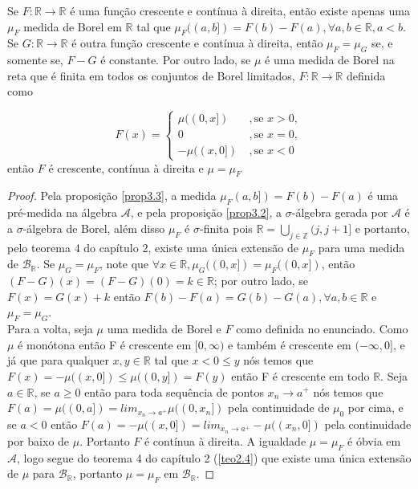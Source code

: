 \begin{teorema}
    Se $F: \mathbb{R} \longrightarrow \mathbb{R}$ é uma função crescente e contínua à direita, então existe apenas uma $\mu_F$ medida de Borel em $\mathbb{R}$ tal que $\mu_F((a,b])=F(b)-F(a), \forall a,b \in \mathbb{R}, a<b$. Se $G: \mathbb{R} \longrightarrow \mathbb{R}$ é outra função crescente e contínua à direita, então $\mu_F = \mu_G$ se, e somente se, $F-G$ é constante. Por outro lado, se $\mu$ é uma medida de Borel na reta que é finita em todos os conjuntos de Borel limitados, $F: \mathbb{R} \longrightarrow \mathbb{R}$ definida como 

    \[
    F(x) = 
    \begin{cases}
         \mu((0,x])  \ & , \text{se } x>0, \\
         0  \ & , \text{se } x=0, \\
         -\mu((x,0])  \ &, \text{se } x<0 
    \end{cases}    
    \]
    então $F$ é crescente, contínua à direita e $\mu = \mu_F$

    \begin{proof}
        Pela proposição \ref{prop3.3}, a medida $\mu_F(a,b])=F(b)-F(a)$ é uma pré-medida na álgebra $\mathcal{A}$, e pela proposição \ref{prop3.2}, a $\sigma$-álgebra gerada por $\mathcal{A}$ é a $\sigma$-álgebra de Borel, além disso $\mu_F$ é $\sigma$-finita pois $\mathbb{R}=\bigcup_{j \in \mathbb{Z}} (j,j+1]$ e portanto, pelo teorema 4 do capítulo 2, existe uma única extensão de $\mu_F$ para uma medida de $\mathcal{B}_{\mathbb{R}}$. Se $\mu_G=\mu_F$, note que $\forall x \in \mathbb{R}, \mu_G ((0,x]) =\mu_F ((0,x])$, então $(F-G)(x)=(F-G)(0) = k \in \mathbb{R}$; por outro lado, se $F(x)=G(x)+k$ então $F(b)-F(a)=G(b)-G(a), \forall a,b \in \mathbb{R}$ e $\mu_F = \mu_G$. \\
        Para a volta, seja $\mu$ uma medida de Borel e $F$ como definida no enunciado. Como $\mu$ é monótona então F é crescente em $[0,\infty)$ e também é crescente em $(-\infty,0]$, e já que para qualquer $x,y \in \mathbb{R}$ tal que $x<0 \leq y$ nós temos que $F(x)=-\mu((x,0]) \leq \mu((0,y]) = F(y)$ então F é crescente em todo $\mathbb{R}$. Seja $a \in \mathbb{R}$, se $a \geq 0$ então para toda sequência de pontos $x_n \to a^+$ nós temos que $F(a)=\mu((0,a])= lim_{x_n \to a^+} \mu((0,x_n])$ pela continuidade de $\mu_0 $ por cima, e se $a < 0$ então $F(a)=-\mu((x,0])= lim_{x_n \to a^+} -\mu((x_n,0])$ pela continuidade por baixo de $\mu$. Portanto $F$ é contínua à direita. A igualdade $\mu = \mu_F$ é óbvia em $\mathcal{A}$, logo segue do teorema 4 do capítulo 2 (\ref{teo2.4}) que existe uma única extensão de $\mu$ para $\mathcal{B}_{\mathbb{R}}$, portanto $\mu = \mu_F$ em $\mathcal{B}_{\mathbb{R}}$.
    \end{proof}
\end{teorema}
